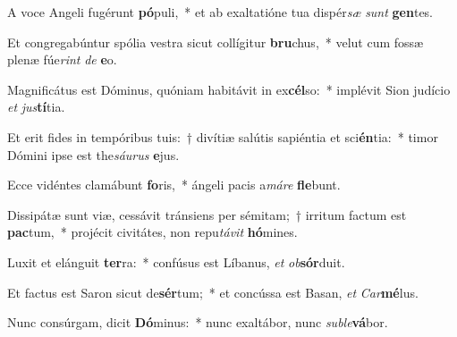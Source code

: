 \item A voce Angeli fugérunt \textbf{pó}puli,~* et ab exaltatióne tua dispér\textit{sæ} \textit{sunt} \textbf{gen}tes.
\item Et congregabúntur spólia vestra sicut collígitur \textbf{bru}chus,~* velut cum fossæ plenæ fúe\textit{rint} \textit{de} \textbf{e}o.
\item Magnificátus est Dóminus, quóniam habitávit in ex\textbf{cél}so:~* implévit Sion judício \textit{et} \textit{jus}\textbf{tí}tia.
\item Et erit fides in tempóribus tuis:~† divítiæ salútis sapiéntia et sci\textbf{én}tia:~* timor Dómini ipse est the\textit{sáu}\textit{rus} \textbf{e}jus.
\item Ecce vidéntes clamábunt \textbf{fo}ris,~* ángeli pacis a\textit{má}\textit{re} \textbf{fle}bunt.
\item Dissipátæ sunt viæ, cessávit tránsiens per sémitam;~† irritum factum est \textbf{pac}tum,~* projécit civitátes, non repu\textit{tá}\textit{vit} \textbf{hó}mines.
\item Luxit et elánguit \textbf{ter}ra:~* confúsus est Líbanus, \textit{et} \textit{ob}\textbf{sór}duit.
\item Et factus est Saron sicut de\textbf{sér}tum;~* et concússa est Basan, \textit{et} \textit{Car}\textbf{mé}lus.
\item Nunc consúrgam, dicit \textbf{Dó}minus:~* nunc exaltábor, nunc \textit{sub}\textit{le}\textbf{vá}bor.
